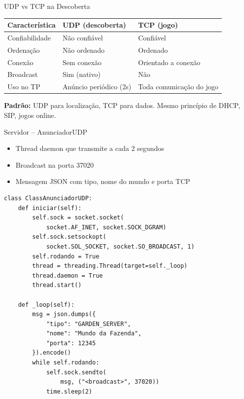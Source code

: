 \documentclass[aspectratio=169]{beamer}
\begin{document}
\begin{frame}{UDP vs TCP na Descoberta}
  \footnotesize
  \begin{tabular}{>{\raggedright\arraybackslash}p{4cm}>{\raggedright\arraybackslash}p{4cm}>{\raggedright\arraybackslash}p{4cm}}
    \toprule
    \textbf{Caracter\'istica} & \textbf{UDP (descoberta)} & \textbf{TCP (jogo)} \\
    \midrule
    Confiabilidade & N\~ao confi\'avel & Confi\'avel \\
    Ordena\c{c}\~ao & N\~ao ordenado & Ordenado \\
    Conex\~ao & Sem conex\~ao & Orientado a conex\~ao \\
    Broadcast & Sim (nativo) & N\~ao \\
    Uso no TP & An\'uncio peri\'odico (2s) & Toda comunica\c{c}\~ao do jogo \\
    \bottomrule
  \end{tabular}
  \vfill
  \textbf{Padr\~ao:} UDP para localiza\c{c}\~ao, TCP para dados. Mesmo princ\'ipio de DHCP, SIP, jogos online.
\end{frame}

\begin{frame}[fragile, shrink=12]{Servidor -- AnunciadorUDP}
  \begin{itemize}
    \item Thread daemon que transmite a cada 2 segundos
    \item Broadcast na porta 37020
    \item Mensagem JSON com tipo, nome do mundo e porta TCP
  \end{itemize}
\begin{lstlisting}[style=pycode, basicstyle=\ttfamily\scriptsize]
class ClassAnunciadorUDP:
    def iniciar(self):
        self.sock = socket.socket(
            socket.AF_INET, socket.SOCK_DGRAM)
        self.sock.setsockopt(
            socket.SOL_SOCKET, socket.SO_BROADCAST, 1)
        self.rodando = True
        thread = threading.Thread(target=self._loop)
        thread.daemon = True
        thread.start()

    def _loop(self):
        msg = json.dumps({
            "tipo": "GARDEN_SERVER",
            "nome": "Mundo da Fazenda",
            "porta": 12345
        }).encode()
        while self.rodando:
            self.sock.sendto(
                msg, ("<broadcast>", 37020))
            time.sleep(2)
\end{lstlisting}
\end{frame}
\end{document}
